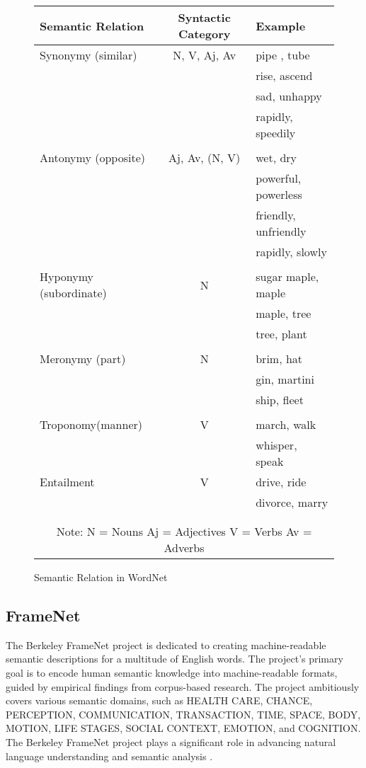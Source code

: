 \begin{figure}
\begingroup
\footnotesize
\centering
\begin{tabularx}{10cm}{l  c  l}
\hline
Semantic Relation	& Syntactic Category	& Example \\
\hline
\hline
Synonymy (similar) &	N, V, Aj, Av	&  pipe , tube \\
 & & rise, ascend \\
  & & sad, unhappy \\
  & & rapidly, speedily \\\\ 
\hline
Antonymy (opposite)&	Aj, Av, (N, V)	&wet, dry \\
& & powerful, powerless \\
 & & friendly, unfriendly\\
 & & rapidly, slowly \\\\ 
 \hline
Hyponymy (subordinate)	&N	&sugar maple, maple \\
&&maple, tree\\
&&tree, plant\\\\ 
\hline
Meronymy (part)	&N	&brim, hat \\
&&gin, martini\\
&&ship, fleet\\\\ 
\hline
Troponomy(manner)&	V	&march, walk\\
&&whisper, speak\\
\hline
Entailment	&V	&drive, ride\\
&&divorce, marry\\\\ 
\hline
\\ 
\multicolumn{3}{c}{Note:     N = Nouns     Aj = Adjectives     V = Verbs     Av = Adverbs} \\
\hline
\end{tabularx}
\begin{TableCaption}
\caption{Semantic Relation in WordNet  \cite{miller1995wordnet}}\label{tb:wordnet}
\end{TableCaption}
\endgroup
\end{figure}

\subsection{FrameNet} \label{framenet}
The Berkeley FrameNet project is dedicated to creating machine-readable semantic descriptions for a multitude of English words. The project's primary goal is to encode human semantic knowledge into machine-readable formats, guided by empirical findings from corpus-based research. The project ambitiously covers various semantic domains, such as HEALTH CARE, CHANCE, PERCEPTION, COMMUNICATION, TRANSACTION, TIME, SPACE, BODY, MOTION, LIFE STAGES, SOCIAL CONTEXT, EMOTION, and COGNITION. The Berkeley FrameNet project plays a significant role in advancing natural language understanding and semantic analysis \cite{baker1998berkeley}.

